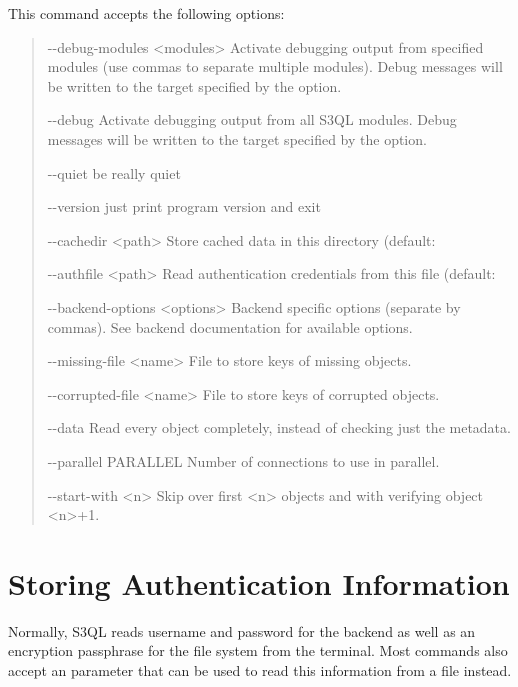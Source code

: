 \documentclass[letterpaper,10pt,english]{sphinxmanual}
\begin{document}
This command accepts the following options:
\begin{quote}
\begin{optionlist}{3cm}
\item [-{-}debug-modules \textless{}modules\textgreater{}]  
Activate debugging output from specified modules (use
commas to separate multiple modules). Debug messages
will be written to the target specified by the
 option.
\item [-{-}debug]  
Activate debugging output from all S3QL modules. Debug
messages will be written to the target specified by
the  option.
\item [-{-}quiet]  
be really quiet
\item [-{-}version]  
just print program version and exit
\item [-{-}cachedir \textless{}path\textgreater{}]  
Store cached data in this directory (default:
\item [-{-}authfile \textless{}path\textgreater{}]  
Read authentication credentials from this file
(default: 
\item [-{-}backend-options \textless{}options\textgreater{}]  
Backend specific options (separate by commas). See
backend documentation for available options.
\item [-{-}missing-file \textless{}name\textgreater{}]  
File to store keys of missing objects.
\item [-{-}corrupted-file \textless{}name\textgreater{}]  
File to store keys of corrupted objects.
\item [-{-}data]  
Read every object completely, instead of checking just
the metadata.
\item [-{-}parallel PARALLEL]  
Number of connections to use in parallel.
\item [-{-}start-with \textless{}n\textgreater{}]  
Skip over first \textless{}n\textgreater{} objects and with verifying object
\textless{}n\textgreater{}+1.
\end{optionlist}
\end{quote}


\chapter{Storing Authentication Information}
\label{authinfo::doc}\label{authinfo:authinfo}\label{authinfo:storing-authentication-information}
Normally, S3QL reads username and password for the backend as well as
an encryption passphrase for the file system from the terminal. Most
commands also accept an  parameter that can be
used to read this information from a file instead.
\end{document}
